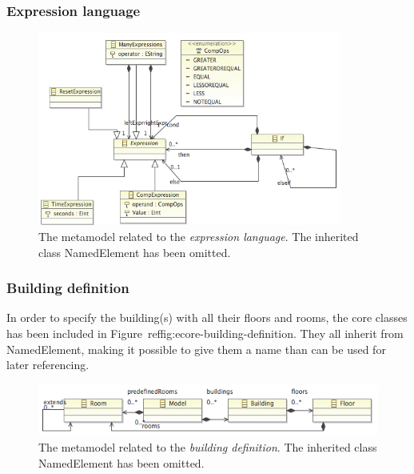 \documentclass{llncs}
\begin{document}
\subsubsection{Expression language}
\begin{figure}
  \centering
    \includegraphics[width=10cm]{ecore-expression-language.png} 
	\caption{The metamodel related to the \textit{expression language}. The inherited class NamedElement has been omitted.}
	\label{fig:ecore-expression-language}
\end{figure}

\pagebreak
\subsubsection{Building definition}
In order to specify the building(s) with all their floors and rooms, the core classes has been included in Figure ref{fig:ecore-building-definition}. They all inherit from NamedElement, making it possible to give them a name than can be used for later referencing.
\begin{figure}
  \centering \includegraphics[scale=0.4]{ecore-building-definition.png}  
	\caption{The metamodel related to the \textit{building definition}. The inherited class NamedElement has been omitted.}
	\label{fig:ecore-building-definition}
\end{figure}
\end{document}
